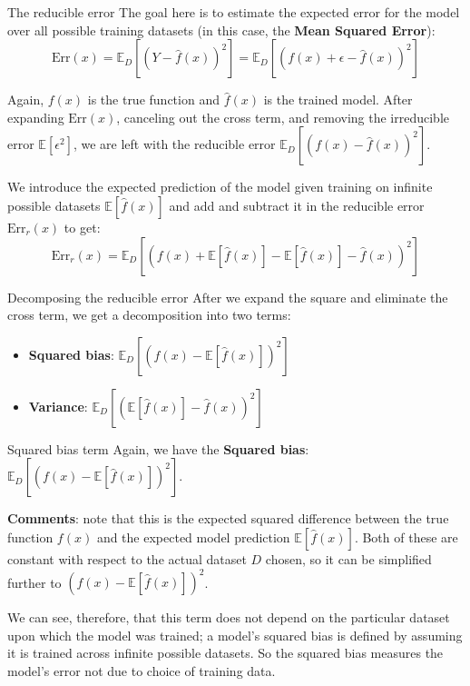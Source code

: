 \documentclass[10pt]{beamer}
\begin{document}
		\begin{frame}{The reducible error}
			The goal here is to estimate the expected error for the model over all possible training datasets (in this case, the \textbf{Mean Squared Error}): $$\text{Err}(x) = \mathbb{E}_D[(Y - \hat{f}(x))^2] = \mathbb{E}_D[(f(x) + \epsilon - \hat{f}(x))^2]$$
			
			Again, $f(x)$ is the true function and $\hat{f}(x)$ is the trained model. After expanding $\text{Err}(x)$, canceling out the cross term, and removing the irreducible error $\mathbb{E}[\epsilon^2]$, we are left with the reducible error $\mathbb{E}_D[(f(x) - \hat{f}(x))^2]$. \vspace{.5cm}
			
			We introduce the expected prediction of the model given training on infinite possible datasets $\mathbb{E}[\hat{f}(x)]$ and add and subtract it in the reducible error $\text{Err}_r(x)$ to get: $$\text{Err}_r(x) = \mathbb{E}_D[(f(x) + \mathbb{E}[\hat{f}(x)] - \mathbb{E}[\hat{f}(x)] - \hat{f}(x))^2]$$
		\end{frame}
		\begin{frame}{Decomposing the reducible error}
			After we expand the square and eliminate the cross term, we get a decomposition into two terms:
			\begin{itemize}
				\item \textbf{Squared bias}: $\mathbb{E}_D[(f(x) - \mathbb{E}[\hat{f}(x)])^2]$
				\item \textbf{Variance}: $\mathbb{E}_D[(\mathbb{E}[\hat{f}(x)] - \hat{f}(x))^2]$
			\end{itemize}
		\end{frame}
		\begin{frame}{Squared bias term}
			Again, we have the \textbf{Squared bias}: $\mathbb{E}_D[(f(x) - \mathbb{E}[\hat{f}(x)])^2]$. \vspace{.5cm}
			
			\textbf{Comments}: note that this is the expected squared difference between the true function $f(x)$ and the expected model prediction $\mathbb{E}[\hat{f}(x)]$. Both of these are constant with respect to the actual dataset $D$ chosen, so it can be simplified further to $(f(x) - \mathbb{E}[\hat{f}(x)])^2$. \vspace{.5cm}
			
			We can see, therefore, that this term does not depend on the particular dataset upon which the model was trained; a model's squared bias is defined by assuming it is trained across infinite possible datasets. So the squared bias measures the model's error not due to choice of training data.
		\end{frame}
\end{document}
